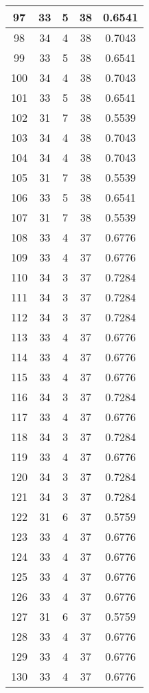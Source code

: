 \documentclass[letterpaper, 12pt]{article}
\begin{document}
\begin{longtable}{|c|c|c|c|c|}
\hline
97 & 33 & 5 & 38 & 0.6541 \\
\hline
98 & 34 & 4 & 38 & 0.7043 \\
\hline
99 & 33 & 5 & 38 & 0.6541 \\
\hline
100 & 34 & 4 & 38 & 0.7043 \\
\hline
101 & 33 & 5 & 38 & 0.6541 \\
\hline
102 & 31 & 7 & 38 & 0.5539 \\
\hline
103 & 34 & 4 & 38 & 0.7043 \\
\hline
104 & 34 & 4 & 38 & 0.7043 \\
\hline
105 & 31 & 7 & 38 & 0.5539 \\
\hline
106 & 33 & 5 & 38 & 0.6541 \\
\hline
107 & 31 & 7 & 38 & 0.5539 \\
\hline
108 & 33 & 4 & 37 & 0.6776 \\
\hline
109 & 33 & 4 & 37 & 0.6776 \\
\hline
110 & 34 & 3 & 37 & 0.7284 \\
\hline
111 & 34 & 3 & 37 & 0.7284 \\
\hline
112 & 34 & 3 & 37 & 0.7284 \\
\hline
113 & 33 & 4 & 37 & 0.6776 \\
\hline
114 & 33 & 4 & 37 & 0.6776 \\
\hline
115 & 33 & 4 & 37 & 0.6776 \\
\hline
116 & 34 & 3 & 37 & 0.7284 \\
\hline
117 & 33 & 4 & 37 & 0.6776 \\
\hline
118 & 34 & 3 & 37 & 0.7284 \\
\hline
119 & 33 & 4 & 37 & 0.6776 \\
\hline
120 & 34 & 3 & 37 & 0.7284 \\
\hline
121 & 34 & 3 & 37 & 0.7284 \\
\hline
122 & 31 & 6 & 37 & 0.5759 \\
\hline
123 & 33 & 4 & 37 & 0.6776 \\
\hline
124 & 33 & 4 & 37 & 0.6776 \\
\hline
125 & 33 & 4 & 37 & 0.6776 \\
\hline
126 & 33 & 4 & 37 & 0.6776 \\
\hline
127 & 31 & 6 & 37 & 0.5759 \\
\hline
128 & 33 & 4 & 37 & 0.6776 \\
\hline
129 & 33 & 4 & 37 & 0.6776 \\
\hline
130 & 33 & 4 & 37 & 0.6776 \\

\end{longtable}
\end{document}
